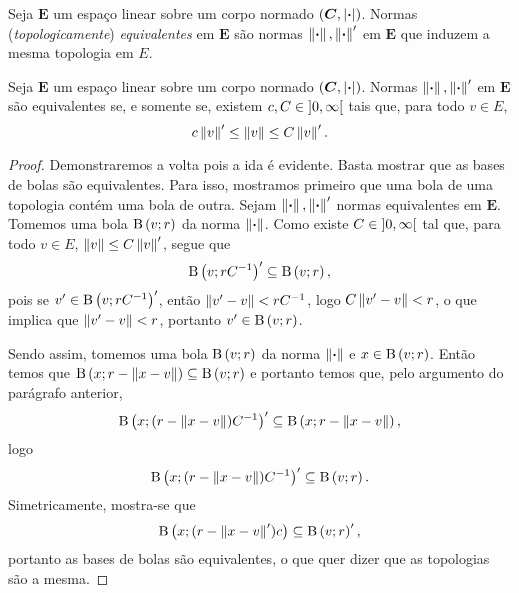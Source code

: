 \begin{definition}
Seja $\bm E$ um espaço linear sobre um corpo normado $(\bm C,\left\vert{\bm{\cdot}}\right\vert)$. Normas (\emph{topologicamente}) \emph{equivalentes} em $\bm E$ são normas $\left\Vert{\bm{\cdot}}\right\Vert, \left\Vert{\bm{\cdot}}\right\Vert'$ em $\bm E$ que induzem a mesma topologia em $E$.
\end{definition}

\begin{proposition}
Seja $\bm E$ um espaço linear sobre um corpo normado $(\bm C,\left\vert{\bm{\cdot}}\right\vert)$. Normas $\left\Vert{\bm{\cdot}}\right\Vert, \left\Vert{\bm{\cdot}}\right\Vert'$ em $\bm E$ são equivalentes se, e somente se, existem $c,C \in \left]0,\allowbreak \infty\right[$ tais que, para todo $v \in E$,
	\begin{equation*}
	c \left\Vert{v}\right\Vert' \leq \left\Vert{v}\right\Vert \leq C \left\Vert{v}\right\Vert'.
	\end{equation*}
\end{proposition}
\begin{proof}
Demonstraremos a volta pois a ida é evidente.
Basta mostrar que as bases de bolas são equivalentes. Para isso, mostramos primeiro que uma bola de uma topologia contém uma bola de outra. Sejam $\left\Vert{\bm{\cdot}}\right\Vert, \left\Vert{\bm{\cdot}}\right\Vert'$ normas equivalentes em $\bm E$. Tomemos uma bola $\mathrm{B}\left(v; r\right)$ da norma $\left\Vert{\bm{\cdot}}\right\Vert$. Como existe $C \in \left]0,\allowbreak \infty\right[$ tal que, para todo $v \in E$, $\left\Vert{v}\right\Vert \leq C \left\Vert{v}\right\Vert'$, segue que
	\begin{equation*}
	\mathrm{B}\left(v; rC^{-1}\right)' \subseteq \mathrm{B}\left(v; r\right),
	\end{equation*}
pois se $v' \in \mathrm{B}\left(v; rC^{-1}\right)'$, então $\left\Vert{v'-v}\right\Vert < rC^{-1}$, logo $C\left\Vert{v'-v}\right\Vert < r$, o que implica que $\left\Vert{v'-v}\right\Vert < r$, portanto $v' \in \mathrm{B}\left(v; r\right)$.

Sendo assim, tomemos uma bola $\mathrm{B}\left(v; r\right)$ da norma $\left\Vert{\bm{\cdot}}\right\Vert$ e $x \in \mathrm{B}\left(v; r\right)$. Então temos que $\mathrm{B}\left(x; r-\left\Vert{x-v}\right\Vert\right) \subseteq \mathrm{B}\left(v; r\right)$
e portanto temos que, pelo argumento do parágrafo anterior,
	\begin{equation*}
	\mathrm{B}\left(x; (r-\left\Vert{x-v}\right\Vert)C^{-1}\right)' \subseteq \mathrm{B}\left(x; r-\left\Vert{x-v}\right\Vert\right),
	\end{equation*}
logo
	\begin{equation*}
	\mathrm{B}\left(x; (r-\left\Vert{x-v}\right\Vert)C^{-1}\right)' \subseteq \mathrm{B}\left(v; r\right).
	\end{equation*}
Simetricamente, mostra-se que
	\begin{equation*}
	\mathrm{B}\left(x; (r-\left\Vert{x-v}\right\Vert')c\right) \subseteq \mathrm{B}\left(v; r\right)',
	\end{equation*}
portanto as bases de bolas são equivalentes, o que quer dizer que as topologias são a mesma.
\end{proof}




